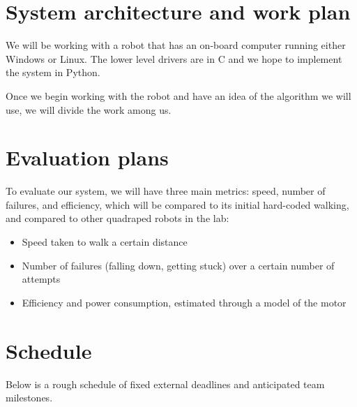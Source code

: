 \section{System architecture and work plan}

We will be working with a robot that has an on-board computer running
either Windows or Linux. The lower level drivers are in C and we hope
to implement the system in Python.

Once we begin working with the robot and have an idea of the algorithm
we will use, we will divide the work among us.



% 
% 
% 


\section{Evaluation plans}
\label{sec:evaluation}

To evaluate our system, we will have three main metrics: speed, number
of failures, and efficiency, which will be compared to its initial
hard-coded walking, and compared to other quadraped robots in the lab:

\begin{itemize}
\item Speed taken to walk a certain distance
\item Number of failures (falling down, getting stuck) over a certain number of attempts
\item Efficiency and power consumption, estimated through a model of the motor
\end{itemize}



\section{Schedule}

Below is a rough schedule of fixed external deadlines and anticipated
team milestones.

